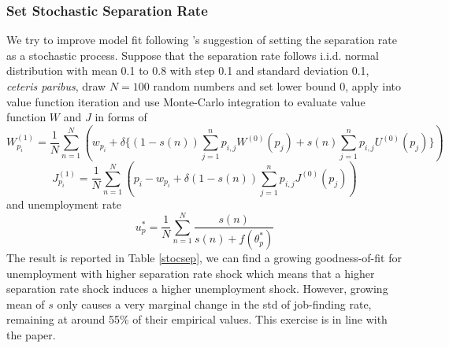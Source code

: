 \documentclass[10pt]{article} %
\begin{document}
    \subsubsection{Set Stochastic Separation Rate}
    We try to improve model fit following \cite{Shimer2005}'s suggestion of setting the separation rate as a stochastic process. 
    Suppose that the separation rate follows i.i.d. normal distribution with mean 0.1 to 0.8 with step 0.1 and standard deviation 0.1, \textit{ceteris paribus}, draw $N=100$ random numbers and set lower bound 0, apply into value function iteration and use Monte-Carlo integration to evaluate value function $W$ and $J$ in forms of 
    \[W^{(1)}_{p_i} =\frac{1}{N}\sum\limits_{n=1}^{N}(w_{p_i} + \delta\{(1-s(n))\sum_{j=1}^{n}p_{i,j}W^{(0)}(p_j) + s(n)\sum_{j=1}^{n}p_{i,j}U^{(0)}(p_j)\})\]
    \[J^{(1)}_{p_i} = \frac{1}{N}\sum\limits_{n=1}^{N}(p_i - w_{p_i} + \delta (1-s(n))\sum_{j=1}^{n}p_{i,j}J^{(0)}(p_j))\]
    and unemployment rate
    \[u^*_p = \frac{1}{N}\sum\limits_{n=1}^{N}\frac{s(n)}{s(n) + f(\theta^*_p)}\]
    The result is reported in Table \ref{stocsep}, we can find a growing goodness-of-fit for unemployment with higher separation rate shock which means that a higher separation rate shock induces a higher unemployment shock. However, growing mean of $s$ only causes a very marginal change in the std of job-finding rate, remaining at around 55\% of their empirical values. This exercise is in line with the paper.\newline
\end{document}
